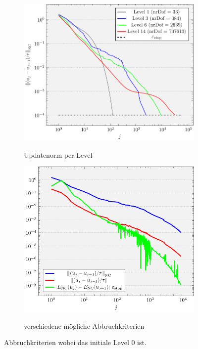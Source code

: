 \begin{figure}[p]
  \centering
  \begin{subfigure}[b]{.5\linewidth}
    \centering
    \caption{Updatenorm per Level}
    \includegraphics[width=\linewidth]
      {pictures/chapExperiments/secExactSol/iteration/lvlWise/termLvl.pdf}
    \label{fig:iterationLevel}
  \end{subfigure}
  \quad
  \begin{subfigure}[b]{.46\linewidth}
    \centering
    \caption{verschiedene mögliche Abbruchkriterien}
    \includegraphics[width=\linewidth]
      {pictures/chapExperiments/secExactSol/iteration/lvlWise/termComp.pdf}
    \label{fig:iterationTerminationVariants}
  \end{subfigure}
  \caption{Abbruchkriterien wobei das initiale Level 0 ist.}
  \label{fig:iterationTermination}
\end{figure}


